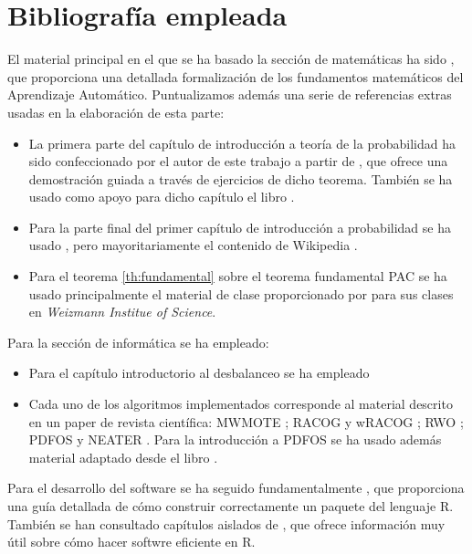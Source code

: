 \section{Bibliografía empleada}
El material principal en el que se ha basado la sección de matemáticas ha sido \citep{shalev}, 
que proporciona una detallada formalización de los fundamentos matemáticos del Aprendizaje Automático. Puntualizamos además
una serie de referencias extras usadas en la elaboración de esta parte:

\begin{itemize} 
 \item La primera parte del capítulo de introducción a teoría de la probabilidad ha sido confeccionado por el autor de 
 este trabajo a partir de \citep{caratheodory}, que ofrece una demostración guiada a través de ejercicios de dicho teorema. 
 También se ha usado como apoyo para dicho capítulo el libro \citep{loeve}. 
 \item Para la parte final del primer capítulo de introducción a probabilidad se ha usado \citep{shalev}, pero
 mayoritariamente el contenido de Wikipedia \citep{wiki:markov, wiki:hoeff_lemma, wiki:hoeffding}.
 \item Para el teorema \ref{th:fundamental} sobre el teorema fundamental PAC se ha usado principalmente el material de clase
 proporcionado por \citep{slfetaya} para sus clases en \textit{Weizmann Institue of Science}.
\end{itemize}
 
 Para la sección de informática se ha empleado:
 
\begin{itemize}
 \item Para el capítulo introductorio al desbalanceo se ha empleado \citep{he2009} 
 \item Cada uno de los algoritmos implementados corresponde al material descrito en un paper de revista científica: 
 MWMOTE \citep{barua14}; RACOG y wRACOG \citep{das2015}; RWO \citep{zhang2014}; PDFOS \citep{gao2014} y 
 NEATER \citep{almogahed2014}. Para la introducción a PDFOS se ha usado además material adaptado desde el libro \citep{silverman}.
\end{itemize}

 Para el desarrollo del software se ha seguido fundamentalmente \citep{rhadleypkg}, que proporciona una guía detallada de
 cómo construir correctamente un paquete del lenguaje R. También se han consultado capítulos aislados de \citep{rgillespie},
 que ofrece información muy útil sobre cómo hacer softwre eficiente en R.
 
